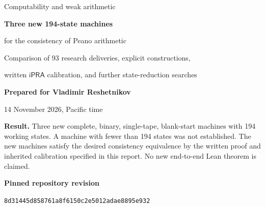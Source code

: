 \documentclass[11pt,letterpaper]{article}
\theoremstyle{definition}
\newcommand{\ipra}{\mathsf{iPRA}}
\begin{document}
\hypersetup{pageanchor=false}
\begin{titlepage}
\vspace*{1.1in}
{\color{MidnightBlue}\Large Computability and weak arithmetic\par}
\vspace{0.35in}
{\Huge\bfseries Three new 194-state machines\par}
\vspace{0.14in}
{\LARGE for the consistency of Peano arithmetic\par}
\vspace{0.4in}
{\large Comparison of 93 research deliveries, explicit constructions,\par
written $\ipra$ calibration, and further state-reduction searches\par}
\vspace{0.65in}
\noindent\textbf{Prepared for Vladimir Reshetnikov}\par
\vspace{0.12in}
14 November 2026, Pacific time\par
\vfill
\noindent\textbf{Result.} Three new complete, binary, single-tape,
blank-start machines with 194 working states. A machine with fewer than
194 states was not established. The new machines satisfy the desired
consistency equivalence by the written proof and inherited calibration
specified in this report. No new end-to-end Lean theorem is claimed.\par
\vspace{0.25in}
\noindent\textbf{Pinned repository revision}\par
\small\texttt{8d31445d858761a8f6150c2e5012adae8895e932}\par
\end{titlepage}
\hypersetup{pageanchor=true}
\end{document}
